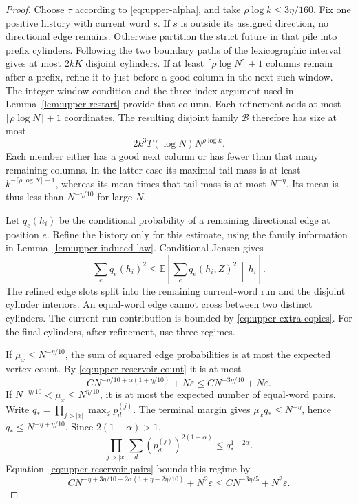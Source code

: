 \documentclass[11pt]{article}
\numberwithin{equation}{section}
\theoremstyle{definition}
\theoremstyle{remark}
\newcommand{\E}{\mathbb E}
\newcommand{\1}{\mathbf 1}
\begin{document}
\begin{proof}
Choose $\tau$ according to \eqref{eq:upper-alpha}, and take
$\rho\log k\le3\eta/160$. Fix one positive history with current
word $s$. If $s$ is outside its assigned direction, no directional
edge remains. Otherwise partition the strict future in that pile
into prefix cylinders. Following the two boundary paths of the
lexicographic interval gives at most $2kK$ disjoint cylinders.
If at least $\lceil\rho\log N\rceil+1$ columns remain after a
prefix, refine it to just before a good column in the next such
window. The integer-window condition and the three-index argument
used in Lemma~\ref{lem:upper-restart} provide that column. Each
refinement adds at most $\lceil\rho\log N\rceil+1$ coordinates.
The resulting disjoint family $\mathcal B$ therefore has size at
most
\begin{equation}\label{eq:upper-future-count}
 2k^3T(\log N)N^{\rho\log k}.
\end{equation}
Each member either has a good next column or has fewer than that
many remaining columns. In the latter case its maximal tail mass
is at least $k^{-\lceil\rho\log N\rceil-1}$, whereas its mean
times that tail mass is at most $N^{-\eta}$. Its mean is thus
less than $N^{-\eta/10}$ for large $N$.

Let $q_e(h_i)$ be the conditional probability of a remaining
directional edge at position $e$. Refine the history only for this
estimate, using the family information in
Lemma~\ref{lem:upper-induced-law}. Conditional Jensen gives
\[
 \sum_e q_e(h_i)^2
 \le\E\left[\sum_e q_e(h_i,Z)^2\,\middle|\,h_i\right].
\]
The refined edge slots split into the remaining current-word run
and the disjoint cylinder interiors. An equal-word edge cannot
cross between two distinct cylinders. The current-run contribution
is bounded by \eqref{eq:upper-extra-copies}. For the final cylinders,
after refinement, use three regimes.

If $\mu_x\le N^{-\eta/10}$, the sum of squared edge probabilities
is at most the expected vertex count. By
\eqref{eq:upper-reservoir-count} it is at most
\[
 CN^{-\eta/10+\alpha(1+\eta/10)}+N\varepsilon
                   \le CN^{-3\eta/40}+N\varepsilon.
\]
If $N^{-\eta/10}<\mu_x\le N^{\eta/10}$, it is at most the
expected number of equal-word pairs. Write
$q_* =\prod_{j>|x|}\max_d p_d^{(j)}$.
The terminal margin gives $\mu_xq_*\le N^{-\eta}$, hence
$q_*\le N^{-\eta+\eta/10}$. Since $2(1-\alpha)>1$,
\[
 \prod_{j>|x|}\sum_d(p_d^{(j)})^{2(1-\alpha)}
                         \le q_*^{1-2\alpha}.
\]
Equation~\eqref{eq:upper-reservoir-pairs} bounds this regime by
\[
 CN^{-\eta+3\eta/10+2\alpha(1+\eta-2\eta/10)}+N^2\varepsilon
                         \le CN^{-3\eta/5}+N^2\varepsilon.
\]


\end{proof}
\end{document}
